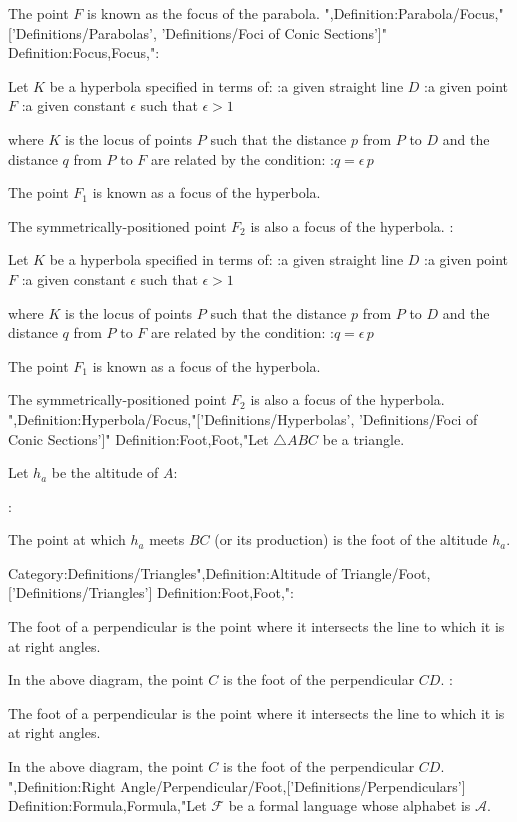 The point $F$ is known as the focus of the parabola.
",Definition:Parabola/Focus,"['Definitions/Parabolas', 'Definitions/Foci of Conic Sections']"
Definition:Focus,Focus,":


Let $K$ be a hyperbola specified in terms of:
:a given straight line $D$
:a given point $F$
:a given constant $\epsilon$ such that $\epsilon > 1$

where $K$ is the locus of points $P$ such that the distance $p$ from $P$ to $D$ and the distance $q$ from $P$ to $F$ are related by the condition:
:$q = \epsilon \, p$


The point $F_1$ is known as a focus of the hyperbola.

The symmetrically-positioned point $F_2$ is also a focus of the hyperbola.
:


Let $K$ be a hyperbola specified in terms of:
:a given straight line $D$
:a given point $F$
:a given constant $\epsilon$ such that $\epsilon > 1$

where $K$ is the locus of points $P$ such that the distance $p$ from $P$ to $D$ and the distance $q$ from $P$ to $F$ are related by the condition:
:$q = \epsilon \, p$


The point $F_1$ is known as a focus of the hyperbola.

The symmetrically-positioned point $F_2$ is also a focus of the hyperbola.
",Definition:Hyperbola/Focus,"['Definitions/Hyperbolas', 'Definitions/Foci of Conic Sections']"
Definition:Foot,Foot,"Let $\triangle ABC$ be a triangle.

Let $h_a$ be the altitude of $A$:

:


The point at which $h_a$ meets $BC$ (or its production) is the foot of the altitude $h_a$.


Category:Definitions/Triangles",Definition:Altitude of Triangle/Foot,['Definitions/Triangles']
Definition:Foot,Foot,":


The foot of a perpendicular is the point where it intersects the line to which it is at right angles.

In the above diagram, the point $C$ is the foot of the perpendicular $CD$.
:


The foot of a perpendicular is the point where it intersects the line to which it is at right angles.

In the above diagram, the point $C$ is the foot of the perpendicular $CD$.
",Definition:Right Angle/Perpendicular/Foot,['Definitions/Perpendiculars']
Definition:Formula,Formula,"Let $\mathcal F$ be a formal language whose alphabet is $\mathcal A$.

